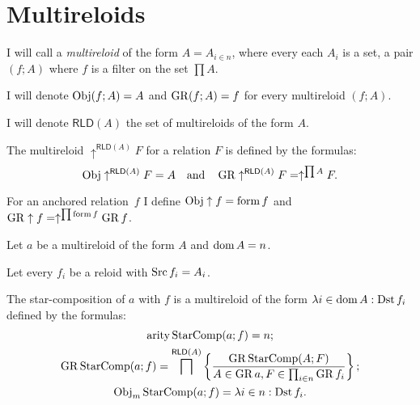 \section{Multireloids}
\begin{defn}
I will call a \emph{multireloid} of the form $A=A_{i\in n}$,
where every each $A_{i}$ is a set, a pair $(f;A)$ where $f$ is
a filter on the set $\prod A$.
\end{defn}

\begin{defn}
I will denote $\operatorname{Obj}(f;A)=A$ and $\operatorname{GR}(f;A)=f$ for every multireloid
$(f;A)$.
\end{defn}
I will denote $\mathsf{RLD}(A)$ the set of multireloids of the form
$A$.

The multireloid $\uparrow^{\mathsf{RLD}(A)}F$ for a relation $F$
is defined by the formulas: 
\[
\operatorname{Obj}\uparrow^{\mathsf{RLD}(A)}F=A\quad\text{and}\quad\operatorname{GR}\uparrow^{\mathsf{RLD}(A)}F=\uparrow^{\prod A}F.
\]


For an anchored relation~$f$ I define $\operatorname{Obj}\uparrow f=\operatorname{form} f$
and $\operatorname{GR}\uparrow f=\uparrow^{\prod\operatorname{form} f}\operatorname{GR} f$.

Let $a$ be a multireloid of the form $A$ and $\operatorname{dom} A=n$.

Let every $f_{i}$ be a reloid with $\operatorname{Src} f_{i}=A_{i}$.

The star-composition of $a$ with $f$ is a multireloid of the form
$\lambda i\in\operatorname{dom} A:\operatorname{Dst} f_{i}$ defined by the formulas:
\begin{gather*}
\operatorname{arity}\operatorname{StarComp}(a;f)=n;\\
\operatorname{GR}\operatorname{StarComp}(a;f)=\bigsqcap^{\mathsf{RLD}(A)}\left\{ \frac{\operatorname{GR}\operatorname{StarComp}(A;F)}{A\in\operatorname{GR} a,F\in\prod_{i\in n}\operatorname{GR} f_{i}}\right\};\\
\operatorname{Obj}_{m}\operatorname{StarComp}(a;f)=\lambda i\in n:\operatorname{Dst} f_{i}.
\end{gather*}

